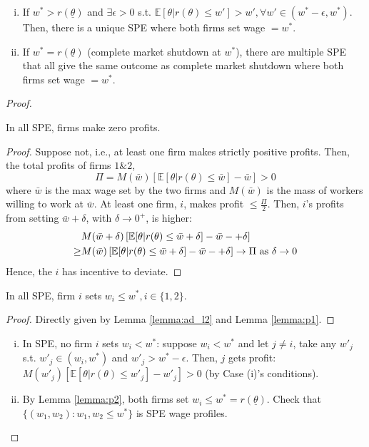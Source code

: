 \documentclass[11pt]{elegantbook}
\begin{document}
\begin{proposition}
    \begin{enumerate}[(i).]
        \item If $w^*>r(\underline{\theta})$ and $\exists \epsilon>0$ s.t. $\mathbb{E}[\theta|r(\theta)\leq w']>w',\forall w'\in \left(w^*-\epsilon,w^*\right)$. Then, there is a unique SPE where both firms set wage $=w^*$.
        \item If $w^*=r(\underline{\theta})$ (complete market shutdown at $w^*$), there are multiple SPE that all give the same outcome as complete market shutdown where both firms set wage $=w^*$.
    \end{enumerate}
\end{proposition}
\begin{proof}
    \begin{lemma}\label{lemma:p1}
        In all SPE, firms make zero profits.
    \end{lemma}
    \begin{proof}
        Suppose not, i.e., at least one firm makes strictly positive profits. Then, the total profits of firms $1\&2$, $$\Pi=M(\bar{w})\left[\mathbb{E}[\theta|r(\theta)\leq\bar{w}]-\bar{w}\right]>0$$
        where $\bar{w}$ is the max wage set by the two firms and $M(\bar{w})$ is the mass of workers willing to work at $\bar{w}$. At least one firm, $i$, makes profit $\leq\frac{\Pi}{2}$. Then, $i$'s profits from setting $\bar{w}+\delta$, with $\delta \rightarrow 0^+$, is higher:
        \begin{equation}
            \begin{aligned}
                &M(\bar{w}+\delta)\left[\mathbb{E}[\theta|r(\theta)\leq\bar{w}+\delta]-\bar{w}-+\delta\right]\\
                \geq &M(\bar{w})\left[\mathbb{E}[\theta|r(\theta)\leq\bar{w}+\delta]-\bar{w}-+\delta\right] \rightarrow \Pi \textnormal{ as }\delta \rightarrow 0
            \end{aligned}
            \nonumber
        \end{equation}
        Hence, the $i$ has incentive to deviate.
    \end{proof}
    \begin{lemma}\label{lemma:p2}
        In all SPE, firm $i$ sets $w_i\leq w^*, i\in\{1,2\}$.
    \end{lemma}
    \begin{proof}
        Directly given by Lemma \ref{lemma:ad_l2} and Lemma \ref{lemma:p1}.
    \end{proof}
    \begin{enumerate}[(i):]
        \item In SPE, no firm $i$ sets $w_i<w^*$: suppose $w_i<w^*$ and let $j\neq i$, take any $w'_j$ s.t. $w'_j\in\left(w_i,w^*\right)$ and $w'_j>w^*-\epsilon$. Then, $j$ gets profit: $M(w'_j)\left[\mathbb{E}[\theta|r(\theta)\leq w'_j]-w'_j\right]>0$ (by Case (i)'s conditions).
        \item By Lemma \ref{lemma:p2}, both firms set $w_i\leq w^*=r(\underline{\theta})$. Check that $\{(w_1,w_2):w_1,w_2\leq w^*\}$ is SPE wage profiles.
    \end{enumerate}
\end{proof}
\end{document}
